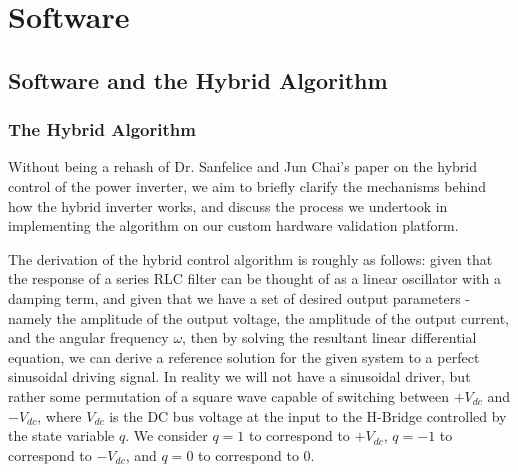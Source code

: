 
\chapter{Software} %

\label{Chapter3} %



\section{Software and the Hybrid Algorithm}

\subsection{The Hybrid Algorithm}
Without being a rehash of Dr. Sanfelice and Jun Chai's paper on the hybrid control of the power inverter\cite{ricardo}, we aim to briefly clarify the mechanisms behind how the hybrid inverter works, and discuss the process we undertook in implementing the algorithm on our custom hardware validation platform. 

The derivation of the hybrid control algorithm is roughly as follows: given that the response of a series RLC filter can be thought of as a linear oscillator with a damping term, and given that we have a set of desired output parameters - namely the amplitude of the output voltage, the amplitude of the output current, and the angular frequency $\omega$, then by solving the resultant linear differential equation, we can derive a reference solution for the given system to a perfect sinusoidal driving signal. In reality we will not have a sinusoidal driver, but rather some permutation of a square wave capable of switching between $+V_{dc}$ and $-V_{dc}$, where $V_{dc}$ is the DC bus voltage at the input to the H-Bridge controlled by the state variable $q$. We consider $q=1$ to correspond to $+V_{dc}$, $q=-1$ to correspond to $-V_{dc}$, and $q=0$ to correspond to $0$.   

